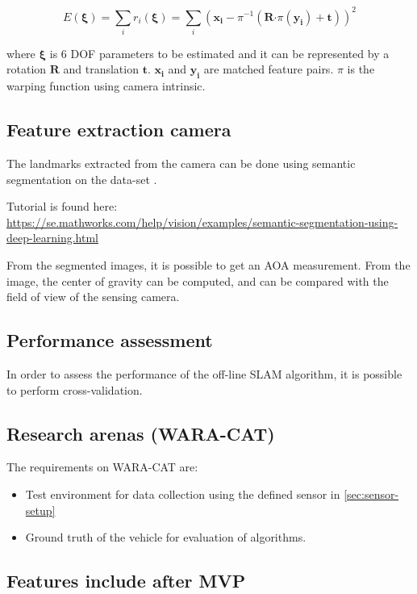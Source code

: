 \begin{equation} \label{eq:pnp}
  E (\bm{\xi}) = \sum_i r_i(\bm{\xi}) = \sum_i ( \bm{x_i} - \pi^{-1}( \mathbf{R} \mathbf{\cdot} \pi(\bm{y_i}) + \mathbf{t}))^2
\end{equation}

where $\bm{\xi}$ is 6 \gls{DOF} parameters to be estimated and it can be
represented by a rotation $\mathbf{R}$ and translation
$\mathbf{t}$. $\bm{x_i}$ and $\bm{y_i}$ are matched feature
pairs. $\pi$ is the warping function using camera intrinsic.

\subsection{Feature extraction camera}

The landmarks extracted from the camera can be done using semantic
segmentation on the data-set \cite{Brostow:2009:SOC:1464534.1465403}.

Tutorial is found here:
\url{https://se.mathworks.com/help/vision/examples/semantic-segmentation-using-deep-learning.html}

From the segmented images, it is possible to get an \gls{AOA}
measurement. From the image, the center of gravity can be computed,
and can be compared with the field of view of the sensing camera.

\subsection{Performance assessment}

In order to assess the performance of the off-line \gls{SLAM}
algorithm, it is possible to perform cross-validation.

\subsection{Research arenas (WARA-CAT)}


The requirements on WARA-CAT are:
\begin{itemize}
  \item Test environment for data collection using the defined sensor in
    \ref{sec:sensor-setup}
\item Ground truth of the vehicle for evaluation of algorithms.
\end{itemize}


\subsection{Features include after MVP}\label{sec:features}

